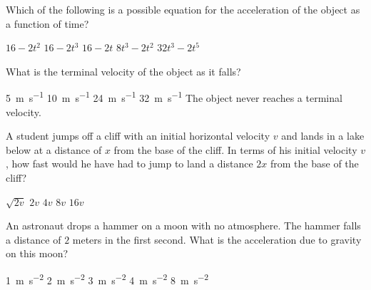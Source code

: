 \documentclass{../../../oss-classkick-exam}
\begin{document}
\begin{multicols*}{2}
\begin{questions}

    \question Which of the following is a possible equation for the
    acceleration of the object as a function of time?
    \begin{choices}
      \choice $16-2t^2$
      \choice $16-2t^3$
      \choice $16-2t$
      \choice $8t^3-2t^2$
      \choice $32t^3-2t^5$
    \end{choices}
    \label{q:fall1}
    
    \question What is the terminal velocity of the object as it falls?
    \begin{choices}
      \choice \SI{5 }{\metre\per\second}
      \choice \SI{10}{\metre\per\second}
      \choice \SI{24}{\metre\per\second}
      \choice \SI{32}{\metre\per\second}
      \choice The object never reaches a terminal velocity.
    \end{choices}
    \label{q:fall2}
    \vspace{.7in}
  
    \question A student jumps off a cliff with an initial horizontal velocity
    $v$ and lands in a lake below at a distance of $x$ from the base of the
    cliff. In terms of his initial velocity $v$, how fast would he have had to
    jump to land a distance $2x$ from the base of the cliff?
    \begin{center}
    \end{center}
    \begin{choices}
      \choice $\sqrt{2v}$
      \choice $2v$
      \choice $4v$
    \choice $8v$
    \choice $16v$
    \end{choices}
    
    \question An astronaut drops a hammer on a moon with no atmosphere. The
    hammer falls a distance of $2$ meters in the first second. What is the
    acceleration due to gravity on this moon?
    \begin{choices}
      \choice\SI{1}{\metre\per\second\squared}
      \choice\SI{2}{\metre\per\second\squared}
      \choice\SI{3}{\metre\per\second\squared}
      \choice\SI{4}{\metre\per\second\squared}
      \choice\SI{8}{\metre\per\second\squared}
    \end{choices}


\end{questions}
\end{multicols*}
\end{document}
